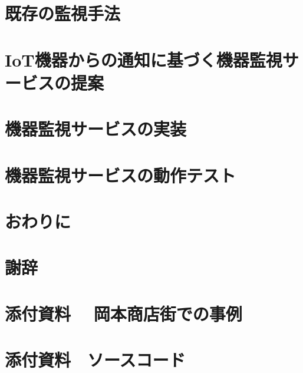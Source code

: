 \documentclass[a4paper]{jreport}
\begin{document}
\chapter{既存の監視手法}

\chapter{IoT機器からの通知に基づく機器監視サービスの提案}

\chapter{機器監視サービスの実装}

\chapter{機器監視サービスの動作テスト}




\chapter{おわりに}


\chapter*{謝辞}




\chapter*{添付資料　 岡本商店街での事例}


\chapter*{添付資料　ソースコード}


\begin{comment}
\chapter*{添付資料　エージェントプログラム用インターフェース　ソースコード
\addcontentsline{toc}{chapter}{添付資料3　エージェントプログラム用インターフェース　ソースコード}

\chapter*{添付資料　Webアプリケーション　ソースコード}
\addcontentsline{toc}{chapter}{添付資料4　Webアプリケーション　ソースコード}
\end{comment}
\end{document}
